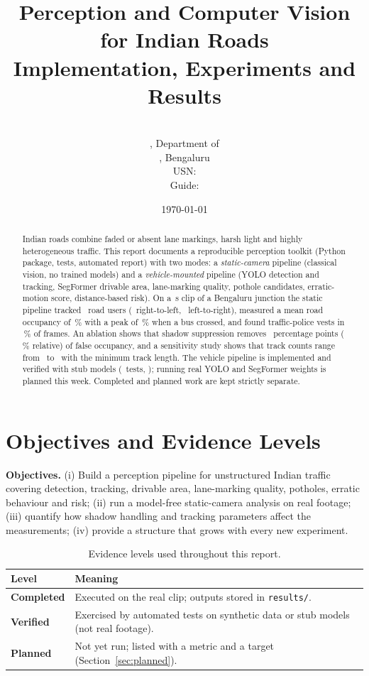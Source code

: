 \documentclass[11pt,a4paper]{article}
\title{\textbf{Perception and Computer Vision for Indian Roads}\\[3pt]
\large Implementation, Experiments and Results}
\author{\textbf{\authorname}\\ \programme, Department of \dept\\ \institute, Bengaluru
  \ifx\usn\empty\else\\ USN: \usn\fi\ifx\guide\empty\else\\ Guide: \guide\fi}
\date{\today}
\newcommand{\pct}[1]{#1\,\%}
\begin{document}
\maketitle
\thispagestyle{fancy}

\begin{abstract}
\noindent
Indian roads combine faded or absent lane markings, harsh light and highly heterogeneous traffic.
This report documents a reproducible perception toolkit (Python package, tests, automated report) with two modes:
a \emph{static-camera} pipeline (classical vision, no trained models) and a \emph{vehicle-mounted} pipeline
(YOLO detection and tracking, SegFormer drivable area, lane-marking quality, pothole candidates, erratic-motion score, distance-based risk).
On a \mDuration\,s clip of a Bengaluru junction the static pipeline tracked \mTracks\ road users
(\mDirRL\ right-to-left, \mDirLR\ left-to-right), measured a mean road occupancy of \pct{\mOccMean} with a peak of \pct{\mOccPeak}
when a bus crossed, and found traffic-police vests in \pct{\mVest} of frames.
An ablation shows that shadow suppression removes \mShadowGainPP\ percentage points (\pct{\mShadowGainRel} relative) of false occupancy,
and a sensitivity study shows that track counts range from \mMtHighTracks\ to \mMtLowTracks\ with the minimum track length.
The vehicle pipeline is implemented and verified with stub models (\mTests\ tests, \mTestsStatus); running real YOLO and SegFormer weights is planned this week.
Completed and planned work are kept strictly separate.
\end{abstract}

\section{Objectives and Evidence Levels}
\textbf{Objectives.}
(i) Build a perception pipeline for unstructured Indian traffic covering detection, tracking, drivable area, lane-marking quality,
potholes, erratic behaviour and risk; (ii) run a model-free static-camera analysis on real footage; (iii) quantify how shadow handling and
tracking parameters affect the measurements; (iv) provide a structure that grows with every new experiment.

\begin{table}[H]
\centering
\caption{Evidence levels used throughout this report.}
\begin{tabular}{@{}lp{11.2cm}@{}}
\toprule
Level & Meaning \\
\midrule
\textbf{Completed} & Executed on the real clip; outputs stored in \texttt{results/}. \\
\textbf{Verified} & Exercised by automated tests on synthetic data or stub models (not real footage). \\
\textbf{Planned} & Not yet run; listed with a metric and a target (Section~\ref{sec:planned}). \\
\bottomrule
\end{tabular}
\end{table}
\end{document}
